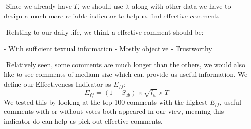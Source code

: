 \documentclass[12pt]{article}  %
\begin{document}
​		Since we already have $T$, we should use it along with other data we have to design a much more reliable indicator to help us find effective comments.

​		Relating to our daily life, we think a effective comment should be:

- With sufficient textual information
- Mostly objective
- Trustworthy

​		Relatively seen, some comments are much longer than the others, we would also like to see comments of medium size which can provide us useful information. We define our Effectiveness Indicator as $E_{ff}$:
$$
E_{ff}=(1-S_{ub}) \times \sqrt{l_{w}}\times T
$$
​		We tested this by looking at the top 100 comments with the highest $E_{ff}$, useful comments with or without votes both appeared in our view, meaning this indicator do can help us pick out effective comments.



\end{document}
